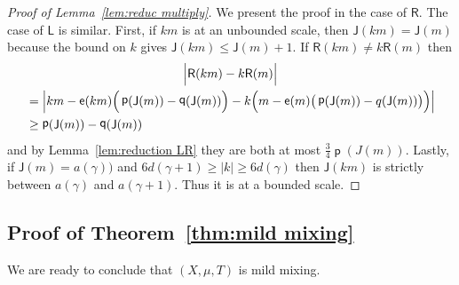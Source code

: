 \documentclass[10pt]{amsart}
\theoremstyle{definition}\newtheorem{defi}[theo]{Definition}\newtheorem{rema}[theo]{Remark}\newtheorem{exam}[theo]{Example}\newtheorem{exem}[theo]{Example}\newtheorem{nota}[theo]{Notation}
\DeclareMathOperator{\lst}{\mathsf{e}}
\DeclareMathOperator{\p}{\mathsf{p}}
\DeclareMathOperator{\q}{\mathsf{q}}
\newcommand{\lft}{\mathsf{L}}
\newcommand{\rht}{\mathsf{R}}
\newcommand{\scl}{\mathsf{J}}
\let\originalleft\left
\let\originalright\right
\renewcommand{\left}{\mathopen{}\mathclose\bgroup\originalleft}
\renewcommand{\right}{\aftergroup\egroup\originalright}
\begin{document}
\begin{proof}[Proof of Lemma~\ref{lem:reduc multiply}]
We present the proof in the case of $\rht$. The case of $\lft$ is similar. First, if $km$ is at an unbounded scale, then $\scl(km) = \scl(m)$ because the bound on $k$ gives $\scl(km) \le \scl(m) + 1$. If $\rht(km) \neq k\rht(m)$ then
\begin{multline*}
\Big\vert\rht(km)-k\rht(m)\Big\vert \\
\begin{aligned}
&= \left\vert km- \lst(km) \Big(\p (\scl (m))-\q(\scl(m))\Big)-k\Big(m - \lst(m) \big(\p(\scl(m))-q(\scl(m))\big)\Big) \right\vert \\
&\ge \p(\scl(m))-\q(\scl(m))
\end{aligned}
\end{multline*}
and by Lemma~\ref{lem:reduction LR} they are both at most $\frac 3 4
\p(J(m))$. Lastly, if $\scl(m)=a(\gamma))$ and $6d(\gamma+1)\geq|k|\geq 6d(\gamma)$ then $\scl(km)$ is strictly between $a(\gamma)$ and $a(\gamma+1)$. Thus it is at a bounded scale.
\end{proof}



\subsection{Proof of Theorem~\ref{thm:mild mixing}}\label{subsec:mild mixing}

We are ready to conclude that $(X,\mu,T)$ is mild mixing.
\end{document}

